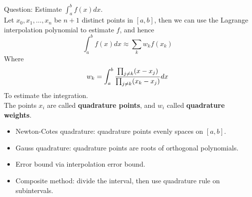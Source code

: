 \documentclass[20pt]{article} %
\theoremstyle{break}
\begin{document}
Question: Estimate $\int_a^bf(x)dx$.\\

Let $x_0, x_1, \dots, x_n$ be $n+1$ distinct points in $[a, b]$, then we can use the Lagrange interpolation polynomial to estimate $f$, and hence 
\[\int_a^b f(x)dx\approx \sum_kw_kf(x_k)\]
  Where
  \[w_k=\int_a^b {\prod_{j\not=k}(x-x_j)\over \prod_{j\not=k}(x_k-x_j)} dx\]
To estimate the integration.\\

The points $x_i$ are called {\bf quadrature points}, and $w_i$ called {\bf quadrature weights}. 


\newpage

\begin{itemize}
\item Newton-Cotes quadrature: quadrature points evenly spaces on $[a, b]$.
\item Gauss quadrature: quadrature points are roots of orthogonal polynomials.
\item Error bound via interpolation error bound.
\item Composite method: divide the interval, then use quadrature rule on subintervals.
\end{itemize}
  
\end{document}
